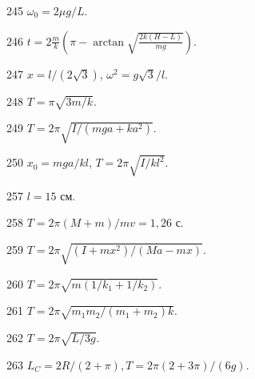 \begin{Answer}{245}
$\omega_0 = 2\mu g /L$.
\end{Answer}
\begin{Answer}{246}
$t = 2\frac{m}{k}\left( \pi - \arctan \sqrt{\frac{2k(H-L)}{mg}}\right)$.
\end{Answer}
\begin{Answer}{247}
$x = l/(2\sqrt{3})$, $\omega^2 = g\sqrt{3} / l$.
\end{Answer}
\begin{Answer}{248}
$T =  \pi\sqrt{3m/k}$.
\end{Answer}
\begin{Answer}{249}
$T = 2 \pi \sqrt{I/(mga + ka^2)}$.
\end{Answer}
\begin{Answer}{250}
$x_0 = mga/kl$, $T = 2 \pi \sqrt{I/kl^2}$.
\end{Answer}
\begin{Answer}{257}
$l = 15$ см.
\end{Answer}
\begin{Answer}{258}
$T = 2 \pi (M+m) / mv = 1,26$ с.
\end{Answer}
\begin{Answer}{259}
$T = 2 \pi \sqrt{(I+mx^2)/(Ma - mx)}$.
\end{Answer}
\begin{Answer}{260}
$T = 2 \pi \sqrt{m(1/k_1 + 1/k_2)}$.
\end{Answer}
\begin{Answer}{261}
$T = 2 \pi \sqrt{m_1m_2/(m_1 + m_2)k}$.
\end{Answer}
\begin{Answer}{262}
$T = 2 \pi \sqrt{L/3g}$.
\end{Answer}
\begin{Answer}{263}
$L_C = 2R/(2 + \pi), T = 2 \pi (2 + 3\pi)/(6g)$.
\end{Answer}
